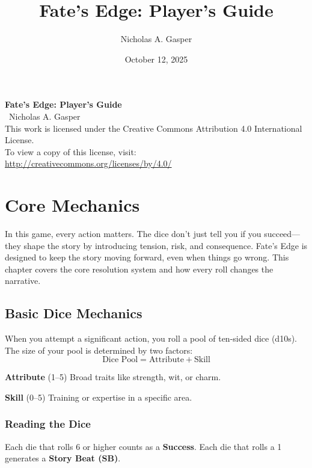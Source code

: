 \documentclass[11pt,twoside,openany]{book}
\title{Fate's Edge: Player's Guide}
\author{Nicholas A. Gasper}
\date{October 12, 2025}
\begin{document}
\maketitle

\thispagestyle{empty}
\begin{center}
\textbf{Fate's Edge: Player's Guide}\\
\textcopyright\ Nicholas A. Gasper\\[1em]

This work is licensed under the Creative Commons Attribution 4.0 International License.\\
To view a copy of this license, visit:\\
\url{http://creativecommons.org/licenses/by/4.0/}
\end{center}

\tableofcontents



\chapter{Core Mechanics} \label{ch:core}

In this game, every action matters. The dice don't just tell you if you succeed—they shape the story by introducing tension, risk, and consequence. Fate's Edge is designed to keep the story moving forward, even when things go wrong. This chapter covers the core resolution system and how every roll changes the narrative.

\section*{Basic Dice Mechanics} 

When you attempt a significant action, you roll a pool of ten-sided dice (d10s). The size of your pool is determined by two factors:
$$\text{Dice Pool} = \text{Attribute} + \text{Skill}$$

\textbf{Attribute} (1--5) Broad traits like strength, wit, or charm.

\textbf{Skill} (0--5) Training or expertise in a specific area.

\subsection*{Reading the Dice}

Each die that rolls 6 or higher counts as a \textbf{Success}. Each die that rolls a 1 generates a \textbf{Story Beat (SB)}.
\end{document}
